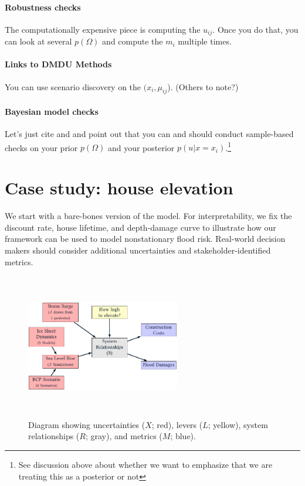 \documentclass[12pt]{article}
\begin{document}
\paragraph{Robustness checks}
The computationally expensive piece is computing the $u_{ij}$.
Once you do that, you can look at several $p(\Omega)$ and compute the $m_i$ multiple times.

\paragraph{Links to DMDU Methods}
You can use scenario discovery on the $(x_i, \mu_{ij}$).
(Others to note?)

\paragraph{Bayesian model checks}
Let's just cite \citet{gelman_workflow:2020} and \citet{gabry_visualization:2019} and point out that you can and should conduct sample-based checks on your prior $p(\Omega)$ and your posterior $p(u | x=x_i)$.\footnote{See discussion above about whether we want to emphasize that we are treating this as a posterior or not}

\section{Case study: house elevation}\label{sec:case}

We start with a bare-bones version of the \citet{zarekarizi_suboptimal:2020} model.
For interpretability, we fix the discount rate, house lifetime, and depth-damage curve to illustrate how our framework can be used to model nonstationary flood risk.
Real-world decision makers should consider additional uncertainties and stakeholder-identified metrics.

\begin{figure}
    \centering
    \includegraphics[height=2.5in, width=0.6\textwidth, keepaspectratio=true]{xlrm}
    \caption{
        Diagram showing uncertainties ($X$; red), levers ($L$; yellow), system relationships ($R$; gray), and metrics ($M$; blue).
    }\label{fig:xlrm}
\end{figure}
\end{document}
